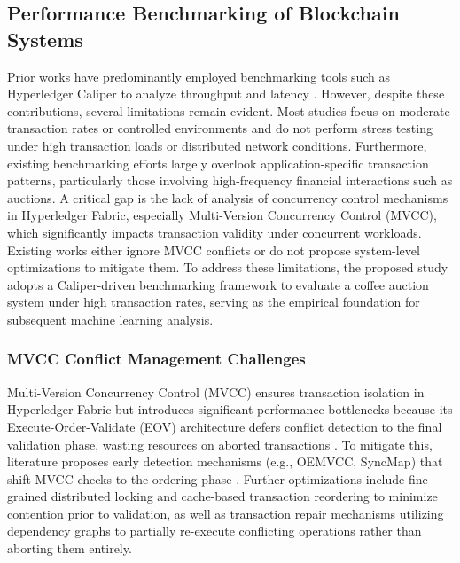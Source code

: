 \documentclass[12pt]{article}
\begin{document}
	\subsection{Performance Benchmarking of Blockchain Systems}
	
	Prior works have predominantly employed benchmarking tools such as Hyperledger Caliper to analyze throughput and latency \cite{kumar_integrating_2026, kaushal_convergence_2025, thakkar_performance_2018, el_hajji_optimization_2024}. However, despite these contributions, several limitations remain evident. Most studies focus on moderate transaction rates or controlled environments and do not perform stress testing under high transaction loads or distributed network conditions. Furthermore, existing benchmarking efforts largely overlook application-specific transaction patterns, particularly those involving high-frequency financial interactions such as auctions. A critical gap is the lack of analysis of concurrency control mechanisms in Hyperledger Fabric, especially Multi-Version Concurrency Control (MVCC), which significantly impacts transaction validity under concurrent workloads. Existing works either ignore MVCC conflicts or do not propose system-level optimizations to mitigate them. To address these limitations, the proposed study adopts a Caliper-driven benchmarking framework to evaluate a coffee auction system under high transaction rates, serving as the empirical foundation for subsequent machine learning analysis.
	
	\subsubsection{MVCC Conflict Management Challenges}

Multi-Version Concurrency Control (MVCC) ensures transaction isolation in Hyperledger Fabric but introduces significant performance bottlenecks because its Execute-Order-Validate (EOV) architecture defers conflict detection to the final validation phase, wasting resources on aborted transactions \cite{Alexandros_Performance_2024}. To mitigate this, literature proposes early detection mechanisms (e.g., OEMVCC, SyncMap) that shift MVCC checks to the ordering phase \cite{Alexandros_Performance_2024, Helmi_Early_2023}. Further optimizations include fine-grained distributed locking and cache-based transaction reordering to minimize contention prior to validation, as well as transaction repair mechanisms utilizing dependency graphs to partially re-execute conflicting operations rather than aborting them entirely.
\end{document}
